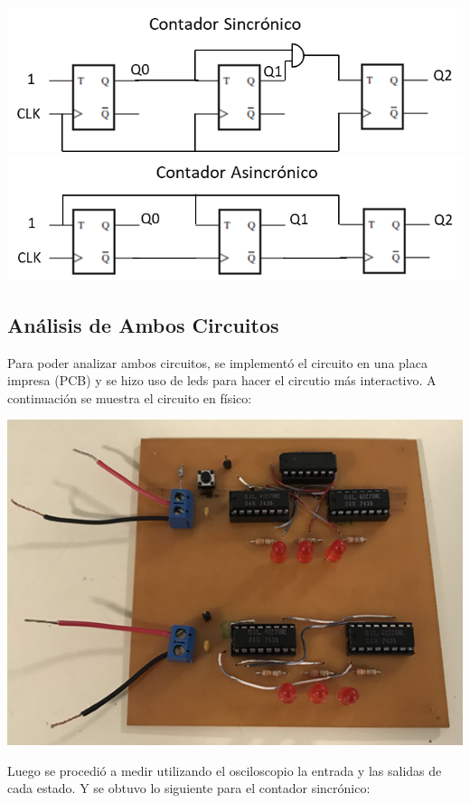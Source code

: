 \begin{center}
\includegraphics{../7-Async-Sync-Counter/contador sinc.png}
\includegraphics{../7-Async-Sync-Counter/contador asinc.png}
\end{center}

\subsection{Análisis de Ambos Circuitos}

Para poder analizar ambos circuitos, se implementó el circuito en una placa impresa (PCB) y se hizo uso de leds para hacer el circutio más interactivo.
A continuación se muestra el circuito en físico:

\begin{center}
\includegraphics{../7-Async-Sync-Counter/pcb.png}
\end{center}

Luego se procedió a medir utilizando el osciloscopio la entrada y las salidas de cada estado. Y se obtuvo lo siguiente para el contador sincrónico:

